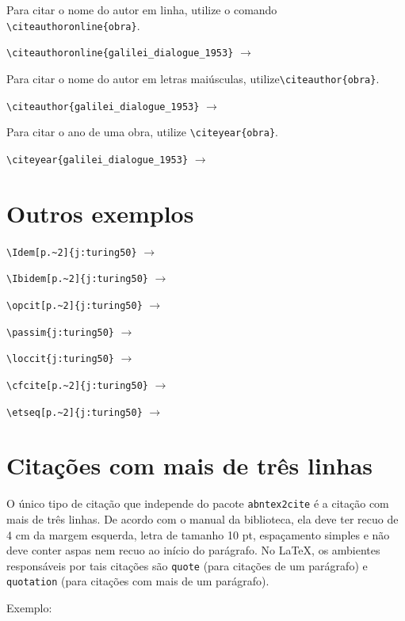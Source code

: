 \documentclass{fei}
\begin{document}
	Para citar o nome do autor em linha, utilize o comando \verb+\citeauthoronline{obra}+.

	\verb++ \(\to\) \citeauthoronline{galilei_dialogue_1953}
	
	Para citar o nome do autor em letras maiúsculas, utilize\verb+\citeauthor{obra}+.

	\verb+\citeauthor{galilei_dialogue_1953}+ \(\to\) \citeauthor{galilei_dialogue_1953}

	Para citar o ano de uma obra, utilize \verb+\citeyear{obra}+.
	
	\verb+\citeyear{galilei_dialogue_1953}+ \(\to\) \citeyear{galilei_dialogue_1953}

	\section{Outros exemplos}

	\verb++ \(\to\) \Idem[p.~2]{j:turing50}

	\verb++ \(\to\) \Ibidem[p.~2]{j:turing50}

	\verb++ \(\to\) \opcit[p.~2]{j:turing50}

	\verb++ \(\to\) \passim{j:turing50}

	\verb++ \(\to\) \loccit{j:turing50}

	\verb++ \(\to\) \cfcite[p.~2]{j:turing50}

	\verb++ \(\to\) \etseq[p.~2]{j:turing50}
	
	\section{Citações com mais de três linhas}
	
	O único tipo de citação que independe do pacote \texttt{abntex2cite} é a citação com mais de três linhas. De acordo com o manual da biblioteca, ela deve ter recuo de 4 cm da margem esquerda, letra de tamanho 10 pt, espaçamento simples e não deve conter aspas nem recuo ao início do parágrafo. No \LaTeX, os ambientes responsáveis por tais citações são \texttt{quote} (para citações de um parágrafo) e \texttt{quotation} (para citações com mais de um parágrafo).
	
	Exemplo:
	
\end{document}
